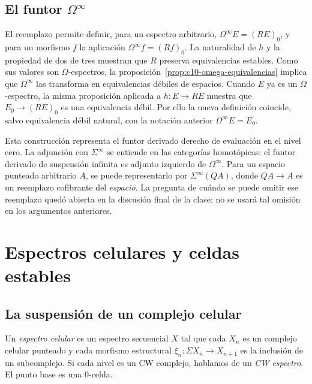 \subsection{El funtor \texorpdfstring{$\Omega^\infty$}{Omega infinito}}

El reemplazo permite definir, para un espectro arbitrario, $\Omega^\infty E=(RE)_0$, y para un morfismo $f$ la aplicación $\Omega^\infty f=(Rf)_0$. La naturalidad de $h$ y la propiedad de dos de tres muestran que $R$ preserva equivalencias estables. Como sus valores son $\Omega$-espectros, la proposición~\ref{prop:c10-omega-equivalencias} implica que $\Omega^\infty$ las transforma en equivalencias débiles de espacios. Cuando $E$ ya es un $\Omega$-espectro, la misma proposición aplicada a $h\colon E\to RE$ muestra que $E_0\to(RE)_0$ es una equivalencia débil. Por ello la nueva definición coincide, salvo equivalencia débil natural, con la notación anterior $\Omega^\infty E=E_0$.

Esta construcción representa el funtor derivado derecho de evaluación en el nivel cero. La adjunción con $\Sigma^\infty$ se entiende en las categorías homotópicas: el funtor derivado de suspensión infinita es adjunto izquierdo de $\Omega^\infty$. Para un espacio punteado arbitrario $A$, se puede representarlo por $\Sigma^\infty(QA)$, donde $QA\to A$ es un reemplazo cofibrante del \emph{espacio}. La pregunta de cuándo se puede omitir ese reemplazo quedó abierta en la discusión final de la clase; no se usará tal omisión en los argumentos anteriores.

\section{Espectros celulares y celdas estables}

\subsection{La suspensión de un complejo celular}

\begin{defi}\label{defi:c10-espectro-celular}
Un \emph{espectro celular} es un espectro secuencial $X$ tal que cada $X_n$ es un complejo celular punteado y cada morfismo estructural $\xi_n\colon\Sigma X_n\to X_{n+1}$ es la inclusión de un subcomplejo. Si cada nivel es un CW complejo, hablamos de un \emph{CW espectro}. El punto base es una $0$-celda.
\end{defi}

